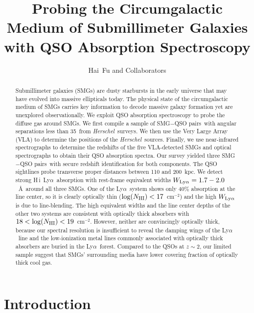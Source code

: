 \documentclass[iop,revtex4,twocolumn,apj,numberedappendix,appendixfloats]{emulateapj}
\newcommand{\hers}{{\it Herschel}}
\newcommand{\cmsq}{{cm$^{-2}$}}
\newcommand{\lya}{Ly$\alpha$}
\newcommand{\HI}{H\,{\sc i}}
\newcommand{\sqps}{SMG$-$QSO pairs}
\begin{document}
\title{Probing the Circumgalactic Medium of Submillimeter Galaxies with QSO Absorption Spectroscopy}

%
\author{
Hai~Fu and Collaborators
}

\begin{abstract}
Submillimeter galaxies (SMGs) are dusty starbursts in the early universe that may have evolved into massive ellipticals today. The physical state of the circumgalactic medium of SMGs carries key information to decode massive galaxy formation yet are unexplored observationally. We exploit QSO absorption spectroscopy to probe the diffuse gas around SMGs.
% 
We first compile a sample of \sqps\ with angular separations less than 35\arcsec\ from \hers\ surveys. We then use the Very Large Array (VLA) to determine the positions of the \hers\ sources. Finally, we use near-infrared spectrographs to determine the redshifts of the five VLA-detected SMGs and optical spectrographs to obtain their QSO absorption spectra. 
%
Our survey yielded three \sqps\ with secure redshift identification for both components. The QSO sightlines probe transverse proper distances between 110 and 200~kpc. We detect strong \HI\ \lya\ absorption with rest-frame equivalent widths $W_{\rm Ly\alpha} = 1.7-2.0$~\AA\ around all three SMGs. One of the \lya\ system shows only 40\% absorption at the line center, so it is clearly optically thin (${\rm log}(N_{\rm HI}) < 17$~\cmsq) and the high $W_{\rm Ly\alpha}$ is due to line-blending. The high equivalent widths and the line center depths of the other two systems are consistent with optically thick absorbers with $18 < {\rm log}(N_{\rm HI}) < 19$~\cmsq. However, neither are convincingly optically thick, because our spectral resolution is insufficient to reveal the damping wings of the \lya\ line and the low-ionization metal lines commonly associated with optically thick absorbers are buried in the \lya\ forest. Compared to the QSOs at $z \sim 2$, our limited sample suggest that SMGs' surrounding media have lower covering fraction of optically thick cool gas. 
\end{abstract}


\section{Introduction} \label{sec:intro}
\end{document}
